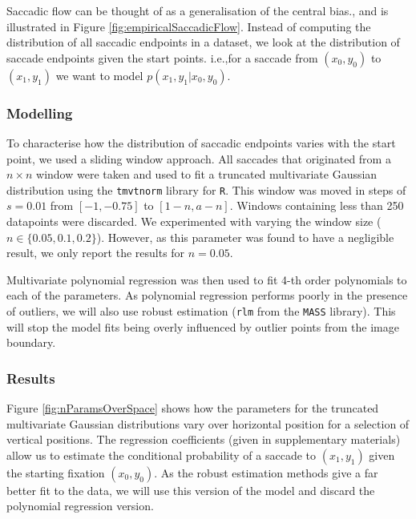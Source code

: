 Saccadic flow can be thought of as a generalisation of the central bias., and is illustrated in Figure \ref{fig:empiricalSaccadicFlow}. Instead of computing the distribution of all saccadic endpoints in a dataset, we look at the distribution of saccade endpoints given the start points. i.e.,for a saccade from $(x_0, y_0)$ to $(x_1, y_1)$ we want to model $p(x_1,y_1|x_0, y_0)$.

\subsubsection{Modelling}

To characterise how the distribution of saccadic endpoints varies with the start point, we used a sliding window approach. All saccades that originated from a $n\times n$ window were taken and used to fit a truncated multivariate Gaussian distribution using the \texttt{tmvtnorm} library for \texttt{R}. This window was moved in steps of $s=0.01$ from $[-1,-0.75]$ to $[1-n, a-n]$. Windows containing less than 250 datapoints were discarded. We experimented with varying the window size ($n\in\{0.05,0.1, 0.2\}$). However, as this parameter was found to have a negligible result, we only report the results for $n=0.05$.

Multivariate polynomial regression was then used to fit 4-th order polynomials to each of the parameters. As polynomial regression performs poorly in the presence of outliers, we will also use robust estimation (\texttt{rlm} from the \texttt{MASS} library). This will stop the model fits being overly influenced by outlier points from the image boundary. 

\subsubsection{Results}

Figure \ref{fig:nParamsOverSpace} shows how the parameters for the truncated multivariate Gaussian distributions vary over horizontal position for a selection of vertical positions. The regression coefficients (given in supplementary materials) allow us to estimate the conditional probability of a saccade to $(x_1, y_1)$ given the starting fixation $(x_0, y_0)$. As the robust estimation methods give a far better fit to the data, we will use this version of the model and discard the polynomial regression version.

